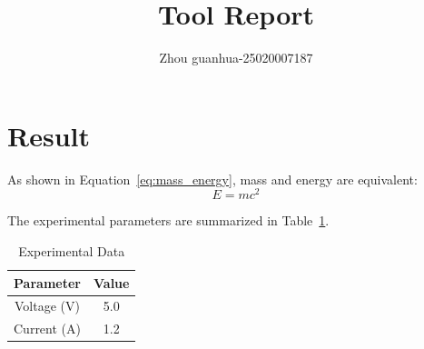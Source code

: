 \documentclass{article}
\begin{document}
\title{Tool Report}
\author{Zhou guanhua-25020007187}
\maketitle

\section{Result}

As shown in Equation~\eqref{eq:mass_energy}, mass and energy are equivalent:
\begin{equation}
E = mc^2 \label{eq:mass_energy}
\end{equation}

The experimental parameters are summarized in Table~\ref{tab:sample_data}.

\begin{table}[htbp]
\centering
\caption{Experimental Data}
\label{tab:sample_data}
\begin{tabular}{|c|c|}
\hline
Parameter & Value \\
\hline
Voltage (V) & 5.0 \\
Current (A) & 1.2 \\
\hline
\end{tabular}
\end{table}
\end{document}

